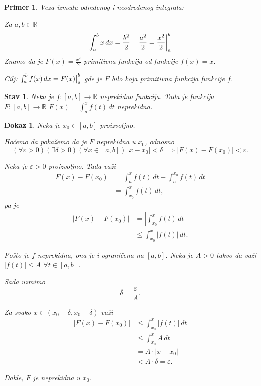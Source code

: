 \documentclass[11pt]{article}
\newcommand{\gr}[2]{%
  \mathchoice
    {\bigg|_{#1}^{#2}}%
    {\big|_{#1}^{#2}}%
    {\scriptstyle|_{#1}^{#2}}%
    {\scriptscriptstyle|_{#1}^{#2}}%
}
\newcounter{mathitem}
\theoremstyle{plain}
\newtheorem{primer}[mathitem]{Primer}
\newtheorem{stav}[mathitem]{Stav}
\theoremstyle{serbnodot}
\newtheorem*{dokaz}{Dokaz}
\begin{document}
\bigskip
\begin{primer}
  Veza između određenog i neodređenog integrala:

  Za \(a, b \in \mathbb{R}\)
  \[
    \int_{a}^{b} x\, dx = \frac{b^2}{2} - \frac{a^2}{2} = \frac{x^2}{2} \gr{a}{b}
  \]
  Znamo da je \(F(x) = \frac{x^2}{2}\) primitivna funkcija od funkcije \(f(x) = x\).

  Cilj: \(\int_{a}^{b} f(x) \,dx = F(x) \gr{a}{b} \) gde je \(F\) bilo koja primitivna funkcija funkcije \(f\).
\end{primer}

\begin{stav}
Neka je \(f:[a, b] \to \mathbb{R}\) neprekidna funkcija. Tada je funkcija 
\(F:[a,b] \to \mathbb{R}\) \(F(x) = \int_{a}^{x} f(t) \,dt\) neprekidna.
\end{stav}
\begin{dokaz}
Neka je \(x_0 \in [a,b]\) proizvoljno.

Hoćemo da pokažemo da je \(F\) neprekidna u \(x_0\), odnosno
\[
(\forall \varepsilon > 0)(\exists \delta > 0)(\forall x \in [a,b])\,
|x-x_0| < \delta \implies |F(x)-F(x_0)| < \varepsilon.
\]

Neka je \(\varepsilon > 0\) proizvoljno. Tada važi
\begin{align*}
F(x)-F(x_0)
    &= \int_a^x f(t)\,dt - \int_a^{x_0} f(t)\,dt \\
    &= \int_{x_0}^x f(t)\,dt,
\end{align*}
pa je
\begin{align*}
|F(x)-F(x_0)|
    &= \left|\int_{x_0}^x f(t)\,dt\right| \\
    &\le \int_{x_0}^x |f(t)|\,dt.
\end{align*}

Pošto je \(f\) neprekidna, ona je i ograničena na \([a,b]\).  
Neka je \(A>0\) takvo da važi \( |f(t)| \le A \)  \(\forall t \in [a,b]\).

Sada uzmimo
\[
\delta = \frac{\varepsilon}{A}.
\]

Za svako \(x \in (x_0-\delta, x_0+\delta)\) važi
\begin{align*}
|F(x)-F(x_0)|
    &\le \int_{x_0}^x |f(t)|\,dt \\
    &\le \int_{x_0}^x A\,dt \\
    &= A \cdot |x-x_0| \\
    &< A \cdot \delta = \varepsilon.
\end{align*}

Dakle, \(F\) je neprekidna u \(x_0\).
\end{dokaz}
\end{document}
